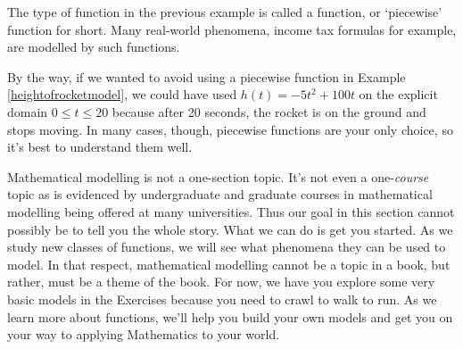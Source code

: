 The type of function in the previous example is called a  function, or `piecewise' function for short.  Many real-world phenomena, income tax formulas for example, are modelled by such functions.  

\label{piecewisefunction}

\medskip

By the way, if we wanted to avoid using a piecewise function in Example \ref{heightofrocketmodel}, we could have used $h(t) = -5t^2 + 100t$ on the explicit domain $0 \leq t \leq 20$ because after 20 seconds, the rocket is on the ground and stops moving.  In many cases, though, piecewise functions are your only choice, so it's best to understand them well.

\medskip

Mathematical modelling is not a one-section topic.  It's not even a one-\emph{course} topic as is evidenced by undergraduate and graduate courses in mathematical modelling being offered at many universities.  Thus our goal in this section cannot possibly be to tell you the whole story.  What we can do is get you started.  As we study new classes of functions, we will see what phenomena they can be used to model.  In that respect, mathematical modelling cannot be a topic in a book, but rather, must be a theme of the book.  For now, we have you explore some very basic models in the Exercises because you need to crawl to walk to run.  As we learn more about functions, we'll help you build your own models and get you on your way to applying Mathematics to your world.



